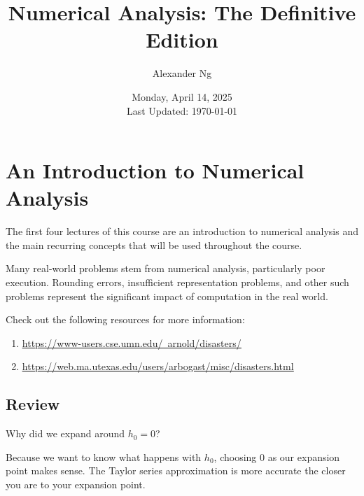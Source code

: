 \documentclass[12pt]{book}
\newcommand{\ulhref}[2]{\href{#1}{\color{blue}\uline{#2}}}
\begin{document}
\title{Numerical Analysis: The Definitive Edition}
\author{Alexander Ng}
\date{Monday, April 14, 2025\\\small Last Updated: \today}

\maketitle

\tableofcontents
\clearpage

\chapter{An Introduction to Numerical Analysis}
\begin{greenquote}
  The first four lectures of this course are an introduction to numerical
  analysis and the main recurring concepts that will be used throughout the
  course.
\end{greenquote}
Many real-world problems stem from numerical analysis, particularly poor 
execution. Rounding errors, insufficient representation problems, and other 
such problems represent the significant impact of computation in the real world.

Check out the following resources for more information:
\begin{enumerate}
  \item \ulhref{https://www-users.cse.umn.edu/~arnold/disasters/}{https://www-users.cse.umn.edu/~arnold/disasters/}
  \item \ulhref{https://web.ma.utexas.edu/users/arbogast/misc/disasters.html}{https://web.ma.utexas.edu/users/arbogast/misc/disasters.html}
\end{enumerate}


% 
% 
% 
% 
\section{Review}

Why did we expand around $h_0 = 0$?

\quad Because we want to know what happens with $h_0$, choosing $0$ as our 
expansion point makes sense. The Taylor series approximation is more accurate 
the closer you are to your expansion point.

\end{document}
